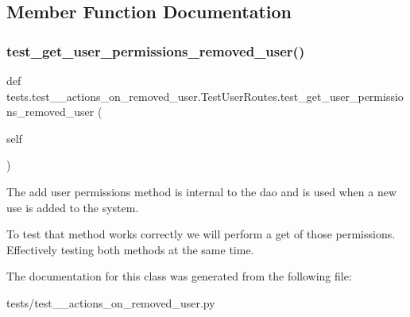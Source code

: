 \subsection{Member Function Documentation}
\mbox{\label{classtests_1_1test__13__actions__on__removed__user_1_1_test_user_routes_a2154e49765948b25aa6e264e8238eed2}} 
\subsubsection{\texorpdfstring{test\+\_\+get\+\_\+user\+\_\+permissions\+\_\+removed\+\_\+user()}{test\_get\_user\_permissions\_removed\_user()}}
{\footnotesize\ttfamily def tests.\+test\+\_\+\_\+actions\+\_\+on\+\_\+removed\+\_\+user.\+Test\+User\+Routes.\+test\+\_\+get\+\_\+user\+\_\+permissions\+\_\+removed\+\_\+user (\begin{DoxyParamCaption}\item[{}]{self }\end{DoxyParamCaption})}



The add user permissions method is internal to the dao and is used when a new use is added to the system. 

To test that method works correctly we will perform a get of those permissions. Effectively testing both methods at the same time. 

The documentation for this class was generated from the following file\+:\begin{DoxyCompactItemize}
\item 
tests/test\+\_\+\_\+actions\+\_\+on\+\_\+removed\+\_\+user.\+py\end{DoxyCompactItemize}
